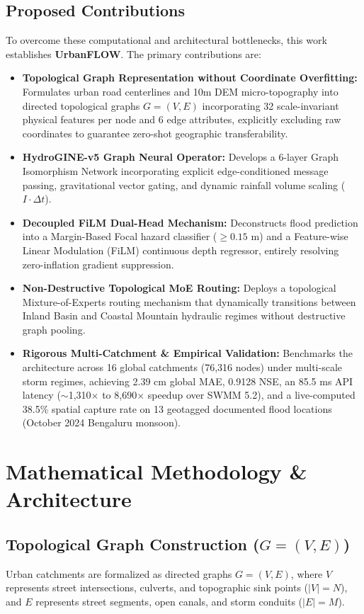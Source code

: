 \documentclass[conference]{IEEEtran}
\begin{document}
\subsection{Proposed Contributions}
To overcome these computational and architectural bottlenecks, this work establishes \textbf{UrbanFLOW}. The primary contributions are:
\begin{itemize}
    \item \textbf{Topological Graph Representation without Coordinate Overfitting:} Formulates urban road centerlines and 10m DEM micro-topography into directed topological graphs $G=(V, E)$ incorporating 32 scale-invariant physical features per node and 6 edge attributes, explicitly excluding raw coordinates to guarantee zero-shot geographic transferability.
    \item \textbf{HydroGINE-v5 Graph Neural Operator:} Develops a 6-layer Graph Isomorphism Network incorporating explicit edge-conditioned message passing, gravitational vector gating, and dynamic rainfall volume scaling ($I \cdot \Delta t$).
    \item \textbf{Decoupled FiLM Dual-Head Mechanism:} Deconstructs flood prediction into a Margin-Based Focal hazard classifier ($\ge 0.15\text{ m}$) and a Feature-wise Linear Modulation (FiLM) continuous depth regressor, entirely resolving zero-inflation gradient suppression.
    \item \textbf{Non-Destructive Topological MoE Routing:} Deploys a topological Mixture-of-Experts routing mechanism that dynamically transitions between Inland Basin and Coastal Mountain hydraulic regimes without destructive graph pooling.
    \item \textbf{Rigorous Multi-Catchment \& Empirical Validation:} Benchmarks the architecture across 16 global catchments (76,316 nodes) under multi-scale storm regimes, achieving 2.39 cm global MAE, 0.9128 NSE, an 85.5 ms API latency ($\sim$1,310$\times$ to 8,690$\times$ speedup over SWMM 5.2), and a live-computed 38.5\% spatial capture rate on 13 geotagged documented flood locations (October 2024 Bengaluru monsoon).
\end{itemize}

\section{Mathematical Methodology \& Architecture}

\subsection{Topological Graph Construction ($G = (V, E)$)}
Urban catchments are formalized as directed graphs $G = (V, E)$, where $V$ represents street intersections, culverts, and topographic sink points ($|V| = N$), and $E$ represents street segments, open canals, and storm conduits ($|E| = M$).
\end{document}
